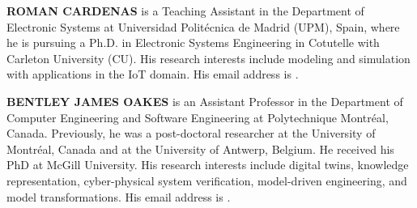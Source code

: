 \documentclass{scspaperproc}
\theoremstyle{scsthe}
\begin{document}
\textbf{\uppercase{Roman Cardenas}} is a Teaching Assistant in the Department of Electronic Systems at Universidad Politécnica de Madrid (UPM), Spain, where he is pursuing a Ph.D. in Electronic Systems Engineering
in Cotutelle with Carleton University (CU). His research interests include modeling and simulation with
applications in the IoT domain. His email address is .

\textbf{\uppercase{Bentley James Oakes}} is an Assistant Professor in the Department of Computer Engineering and Software Engineering at Polytechnique Montr\'{e}al, Canada. Previously, he was a post-doctoral researcher at the University of Montr\'{e}al, Canada and at the University of Antwerp, Belgium. He received his PhD at McGill University. His research interests include digital twins, knowledge representation, cyber-physical system verification, model-driven engineering, and model transformations. His email address is .
\end{document}
